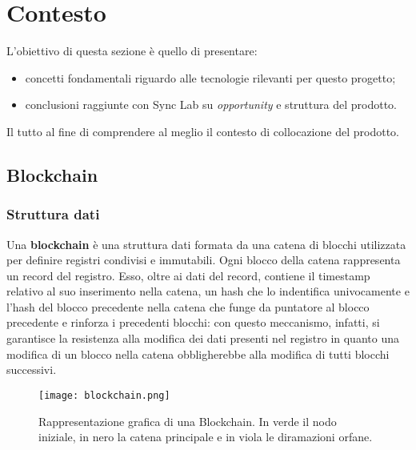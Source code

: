 
\chapter{Contesto}
\label{cap:contesto}
L’obiettivo di questa sezione è quello di presentare:
\begin{itemize}
    \item concetti fondamentali riguardo alle tecnologie rilevanti per questo progetto;
    \item conclusioni raggiunte con Sync Lab su \textit{opportunity} e struttura del prodotto.
\end{itemize}
Il tutto al fine di comprendere al meglio il contesto di collocazione del prodotto.

\section{Blockchain}
\label{contesto:blockchain}
    \subsection{Struttura dati}
    \label{contesto:blockchain:struttura}
    Una \textbf{blockchain} è una struttura dati formata da una catena di blocchi utilizzata per definire registri condivisi e immutabili. Ogni blocco della catena rappresenta un record del registro. Esso, oltre ai dati del record, contiene il timestamp relativo al suo inserimento nella catena, un hash che lo indentifica univocamente e l'hash del blocco precedente nella catena che funge da puntatore al blocco precedente e rinforza i precedenti blocchi: con questo meccanismo, infatti, si garantisce la resistenza alla modifica dei dati presenti nel registro in quanto una modifica di un blocco nella catena obbligherebbe alla modifica di tutti blocchi successivi.

    \begin{figure}[h!]
        \centering
        \texttt{[image: blockchain.png]}
        \caption[Rappresentazione grafica di una Blockchain]{Rappresentazione grafica di una Blockchain. In verde il nodo iniziale, in nero la catena principale e in viola le diramazioni orfane.}
    \end{figure}

